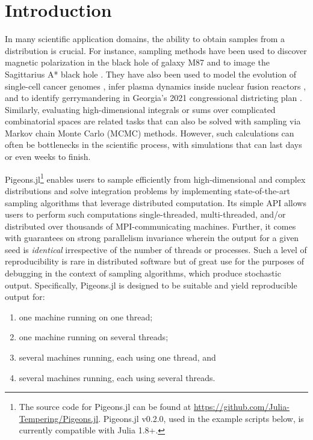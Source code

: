 \section{Introduction}
In many scientific application domains, the ability to obtain samples from a 
distribution is crucial. 
For instance, sampling methods have been used to discover magnetic polarization 
in the black hole of galaxy M87 \cite{akiyama2021seven}
and to image the Sagittarius A* black hole \cite{akiyama2022first}.
They have also been used to 
model the evolution of single-cell cancer genomes \cite{salehi2021clonal}, 
infer plasma dynamics inside nuclear fusion reactors \cite{gota2021overview}, 
and to identify gerrymandering in Georgia's 2021 congressional districting plan 
\cite{zhao2022mathematically}.
Similarly, evaluating high-dimensional integrals or sums over complicated 
combinatorial spaces are related tasks that can also be solved with sampling 
via Markov chain Monte Carlo (MCMC) methods. 
However, such calculations can often be bottlenecks in the scientific process, with 
simulations that can last days or even weeks to finish. 

\medskip
Pigeons.jl\footnote{The source code for Pigeons.jl can be found at 
\url{https://github.com/Julia-Tempering/Pigeons.jl}. 
Pigeons.jl v0.2.0, used in the example scripts below, is currently compatible with Julia 1.8+.}
enables users to sample efficiently from high-dimensional and complex distributions 
and solve integration problems by 
implementing state-of-the-art sampling algorithms \cite{syed2021nrpt,surjanovic2022vpt} 
that leverage distributed computation. Its simple API allows users to perform such computations 
single-threaded, multi-threaded, and/or distributed over thousands of MPI-communicating 
machines. Further, it comes with guarantees on strong parallelism invariance wherein 
the output for a given seed is \emph{identical} irrespective 
of the number of threads or processes. 
Such a level of reproducibility is rare in distributed software but of 
great use for the purposes of debugging in the context of sampling algorithms, 
which produce stochastic output.
Specifically, Pigeons.jl is designed to be suitable and yield reproducible output for:
\begin{enumerate}
    \item one machine running on one thread;
    \item one machine running on several threads;
    \item several machines running, each using one thread, and
    \item several machines running, each using several threads.
\end{enumerate}


